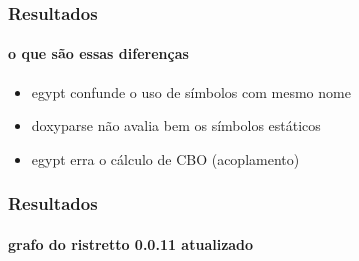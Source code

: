 \documentclass{beamer}
\begin{document}
\begin{frame}
\frametitle{Resultados}
\framesubtitle{o que são essas diferenças}
 \begin{itemize}
 \item egypt confunde o uso de símbolos com mesmo nome
 \item doxyparse não avalia bem os símbolos estáticos
 \item egypt erra o cálculo de CBO (acoplamento)
 \end{itemize}
\end{frame}

\begin{frame}
\frametitle{Resultados}
\framesubtitle{grafo do ristretto 0.0.11 atualizado}
 \begin{figure}
 \center
 \qquad
 \label{fig:ristretto-0.0.11-antes-depois}
 \end{figure}
\end{frame}
\end{document}

